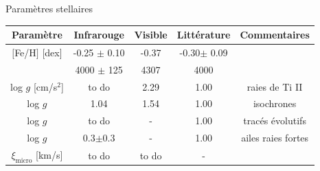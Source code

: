 \documentclass[10pt]{beamer}
\begin{document}
\begin{frame}[fragile]{Paramètres stellaires}
    \begin{table}[h!]
        \begin{center}
            \renewcommand{\arraystretch}{1.5}
            \begin{tabular}{c|ccc|c}
                Paramètre & Infrarouge &Visible& Littérature &Commentaires\\
                \hline
                
                $[$Fe/H$]$ [dex]& -0.25 $\pm$ 0.10 & -0.37 &
                -0.30$\pm$ 0.09&\\
                \arrayrulecolor{red}\hline
                \multicolumn{1}{|c}{T$_{\rm eff}$ [K]} & 4000 $\pm$ 125 &4307 & 4000& \multicolumn{1}{c|}{}\\
                \arrayrulecolor{red}\hline
    
                log $g$ [cm/s$^2$]& to do & 2.29 & 1.00&raies de Ti II\\
                log $g$ & 1.04 & 1.54 & 1.00 &isochrones\\
                log $g$ & to do & - & 1.00 &tracés évolutifs\\
                log $g$  &0.3$\pm$0.3 &-& 1.00 &ailes raies fortes\\
                $\xi_{\text{micro}}$ [km/s]& to do & to do & - &\\
            \end{tabular}
        \end{center}
    \end{table}
    \end{frame}
\end{document}

